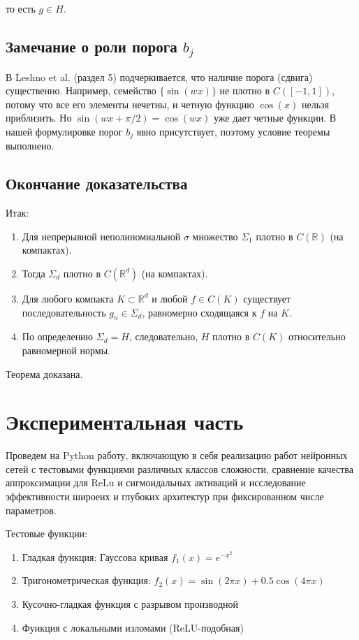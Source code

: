 \documentclass[12pt]{article}
\begin{document}
	то есть $g \in H$.
	
	\subsection{Замечание о роли порога $b_j$}
	
	В Leshno et al. (раздел 5) подчеркивается, что наличие порога (сдвига) существенно. Например, семейство $\{ \sin(w x) \}$ не плотно в $C([-1,1])$, потому что все его элементы нечетны, и четную функцию $\cos(x)$ нельзя приблизить. Но $\sin(w x + \pi/2) = \cos(w x)$ уже дает четные функции. В нашей формулировке порог $b_j$ явно присутствует, поэтому условие теоремы выполнено.
	
	\subsection{Окончание доказательства}
	
	Итак:
	
	\begin{enumerate}
		\item Для непрерывной неполиномиальной $\sigma$ множество $\Sigma_1$ плотно в $C(\mathbb{R})$ (на компактах).
		\item Тогда $\Sigma_d$ плотно в $C(\mathbb{R}^d)$ (на компактах).
		\item Для любого компакта $K \subset \mathbb{R}^d$ и любой $f \in C(K)$ существует последовательность $g_n \in \Sigma_d$, равномерно сходящаяся к $f$ на $K$.
		\item По определению $\Sigma_d = H$, следовательно, $H$ плотно в $C(K)$ относительно равномерной нормы.
	\end{enumerate}
	
	Теорема доказана.
	
	\section{Экспериментальная часть}
	
	Проведем на Python работу, включающую в себя реализацию работ нейронных сетей с тестовыми функциями различных классов сложности, сравнение качества аппроксимации для ReLu и сигмоидальных активаций и исследование эффективности широеих и глубоких архитектур при фиксированном числе параметров.
	
	Тестовые функции:
	\begin{enumerate}
		\item Гладкая функция: Гауссова кривая $f_1(x) = e^{-x^2}$
		\item Тригонометрическая функция: $f_2(x) = \sin(2\pi x) + 0.5\cos(4\pi x)$
		\item Кусочно-гладкая функция с разрывом производной
		\item Функция с локальными изломами (ReLU-подобная)
	\end{enumerate}
	
\end{document}
